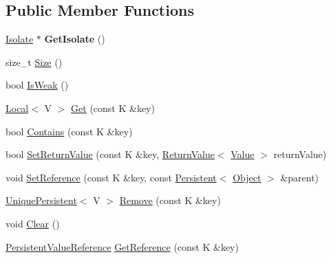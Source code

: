 \subsection*{Public Member Functions}
\begin{DoxyCompactItemize}
\item 
\hypertarget{classv8_1_1_persistent_value_map_base_a80da7adc6e8bdb166912075346116978}{}\hyperlink{classv8_1_1_isolate}{Isolate} $\ast$ {\bfseries Get\+Isolate} ()\label{classv8_1_1_persistent_value_map_base_a80da7adc6e8bdb166912075346116978}

\item 
size\+\_\+t \hyperlink{classv8_1_1_persistent_value_map_base_ade5c5db2a968fdabe073649e85b837eb}{Size} ()
\item 
bool \hyperlink{classv8_1_1_persistent_value_map_base_a9f824b13dd30605589508db2740dd678}{Is\+Weak} ()
\item 
\hyperlink{classv8_1_1_local}{Local}$<$ V $>$ \hyperlink{classv8_1_1_persistent_value_map_base_a16b8f906ea42036c2f37d44813bf2a72}{Get} (const K \&key)
\item 
bool \hyperlink{classv8_1_1_persistent_value_map_base_a8c68e5f99c4042541c6d32232c97282a}{Contains} (const K \&key)
\item 
bool \hyperlink{classv8_1_1_persistent_value_map_base_a85201649d2bbd0ffdebe8be3d5c6447a}{Set\+Return\+Value} (const K \&key, \hyperlink{classv8_1_1_return_value}{Return\+Value}$<$ \hyperlink{classv8_1_1_value}{Value} $>$ return\+Value)
\item 
void \hyperlink{classv8_1_1_persistent_value_map_base_a6fa5f720b283dd9fa626a67e7687dcd0}{Set\+Reference} (const K \&key, const \hyperlink{classv8_1_1_persistent}{Persistent}$<$ \hyperlink{classv8_1_1_object}{Object} $>$ \&parent)
\item 
\hyperlink{classv8_1_1_unique_persistent}{Unique\+Persistent}$<$ V $>$ \hyperlink{classv8_1_1_persistent_value_map_base_a7d458c99e84d61d8a2e63442c0c2b979}{Remove} (const K \&key)
\item 
void \hyperlink{classv8_1_1_persistent_value_map_base_a1bf074e7a7c24713c9a3d40ddce89e74}{Clear} ()
\item 
\hyperlink{classv8_1_1_persistent_value_map_base_1_1_persistent_value_reference}{Persistent\+Value\+Reference} \hyperlink{classv8_1_1_persistent_value_map_base_a52e74c69b94c7ce77a65af9f32d68af4}{Get\+Reference} (const K \&key)
\end{DoxyCompactItemize}
